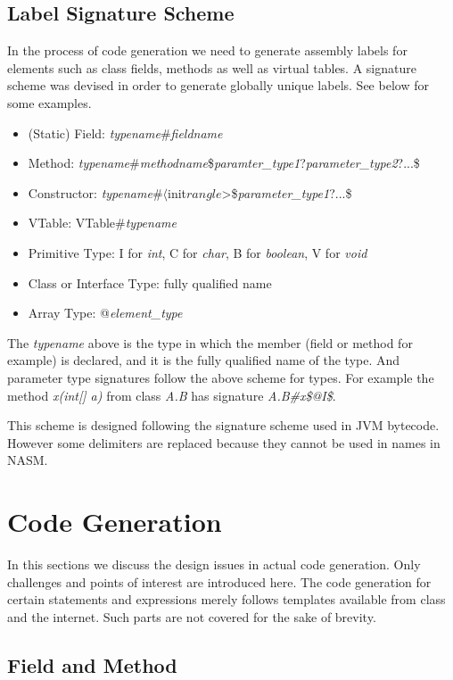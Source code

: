 \documentclass[a4paper, notitlepage]{report}
\begin{document}
\subsection{Label Signature Scheme}
In the process of code generation we need to generate assembly labels for elements such as class fields, methods as well as virtual tables. A signature scheme was devised in order to generate globally unique labels. See below for some examples.
\begin{itemize}
\item (Static) Field: \emph{typename}\#\emph{fieldname}
\item Method: \emph{typename}\#\emph{methodname}\$\emph{paramter\_type1}?\emph{parameter\_type2}?...\$
\item Constructor: \emph{typename}\#$\langle$init$rangle$>\$\emph{parameter\_type1}?...\$
\item VTable: VTable\#\emph{typename}
\item Primitive Type: I for \emph{int}, C for \emph{char}, B for \emph{boolean}, V for \emph{void}
\item Class or Interface Type: fully qualified name
\item Array Type: @\emph{element\_type}
\end{itemize}
The \emph{typename} above is the type in which the member (field or method for example) is declared, and it is the fully qualified name of the type. And parameter type signatures follow the above scheme for types. For example the method \emph{x(int[] a)} from class \emph{A.B} has signature \emph{A.B\#x\$@I\$}.

This scheme is designed following the signature scheme used in JVM bytecode. However some delimiters are replaced because they cannot be used in names in NASM.

\section{Code Generation}

In this sections we discuss the design issues in actual code generation. Only challenges and points of interest are introduced here. The code generation for certain statements and expressions merely follows templates available from class and the internet. Such parts are not covered for the sake of brevity.

\subsection{Field and Method}
\label{method_invoke}
\end{document}
